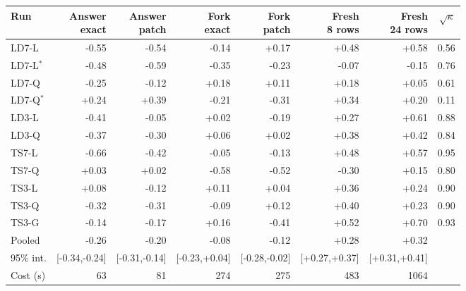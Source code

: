 \begin{tabular}{lrrrrrrr}
\toprule
Run & \makecell{Answer\\exact} & \makecell{Answer\\patch} & \makecell{Fork\\exact} & \makecell{Fork\\patch} & \makecell{Fresh\\8 rows} & \makecell{Fresh\\24 rows} & $\sqrt{\kappa}$ \\
\midrule
LD7-L & -0.55 & -0.54 & -0.14 & +0.17 & +0.48 & +0.58 & 0.56 \\
LD7-L$^\ast$ & -0.48 & -0.59 & -0.35 & -0.23 & -0.07 & -0.15 & 0.76 \\
LD7-Q & -0.25 & -0.12 & +0.18 & +0.11 & +0.18 & +0.05 & 0.61 \\
LD7-Q$^\ast$ & +0.24 & +0.39 & -0.21 & -0.31 & +0.34 & +0.20 & 0.11 \\
LD3-L & -0.41 & -0.05 & +0.02 & -0.19 & +0.27 & +0.61 & 0.88 \\
LD3-Q & -0.37 & -0.30 & +0.06 & +0.02 & +0.38 & +0.42 & 0.84 \\
TS7-L & -0.66 & -0.42 & -0.05 & -0.13 & +0.48 & +0.57 & 0.95 \\
TS7-Q & +0.03 & +0.02 & -0.58 & -0.52 & -0.30 & +0.15 & 0.80 \\
TS3-L & +0.08 & -0.12 & +0.11 & +0.04 & +0.36 & +0.24 & 0.90 \\
TS3-Q & -0.32 & -0.31 & -0.09 & +0.12 & +0.40 & +0.23 & 0.90 \\
TS3-G & -0.14 & -0.17 & +0.16 & -0.41 & +0.52 & +0.70 & 0.93 \\
\midrule
Pooled & -0.26 & -0.20 & -0.08 & -0.12 & +0.28 & +0.32 & \\
95\% int. & \scriptsize[-0.34,-0.24] & \scriptsize[-0.31,-0.14] & \scriptsize[-0.23,+0.04] & \scriptsize[-0.28,-0.02] & \scriptsize[+0.27,+0.37] & \scriptsize[+0.31,+0.41] & \\
Cost (s) & 63 & 81 & 274 & 275 & 483 & 1064 & \\
\bottomrule
\end{tabular}
